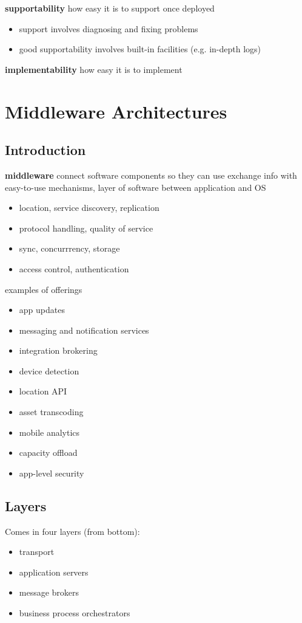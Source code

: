 \documentclass[]{article}
\theoremstyle{definition}
\begin{document}
	\textbf{supportability} how easy it is to support once deployed
	\begin{itemize}
		\item support involves diagnosing and fixing problems
		\item good supportability involves built-in facilities (e.g. in-depth logs)
	\end{itemize}

	\textbf{implementability} how easy it is to implement

	\section{Middleware Architectures}
	\subsection{Introduction}
	\textbf{middleware} connect software components so they can use exchange info with easy-to-use mechanisms, layer of software between application and OS
	\begin{itemize}
		\item location, service discovery, replication
		\item protocol handling, quality of service
		\item sync, concurrrency, storage
		\item access control, authentication
	\end{itemize}
	examples of offerings
	\begin{itemize}
		\item app updates
		\item messaging and notification services
		\item integration brokering 
		\item device detection 
		\item location API
		\item asset transcoding
		\item mobile analytics
		\item capacity offload
		\item app-level security
	\end{itemize}

	\subsection{Layers}
	Comes in four layers (from bottom):
	\begin{itemize}
		\item transport
		\item application servers
		\item message brokers
		\item business process orchestrators
	\end{itemize}
\end{document}
